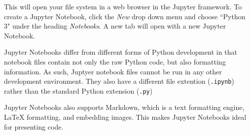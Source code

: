 This will open your file system in a web browser in the Jupyter framework. To create a Jupyter Notebook, click the \emph{New} drop down menu and choose ``Python 3" under the heading \emph{Notebooks}. A new tab will open with a new Jupyter Notebook.

Jupyter Notebooks differ from different forms of Python development in that notebook files contain not only the raw Python code, but also formatting information. As such, Juptyer notebook files cannot be run in any other development environment. They also have a different file extention (\texttt{.ipynb}) rather than the standard Python extension (\texttt{.py})

Jupyter Notebooks also supports Markdown, which is a text formatting engine, LaTeX formatting, and embedding images. This makes Jupyter Notebooks ideal for presenting code.
